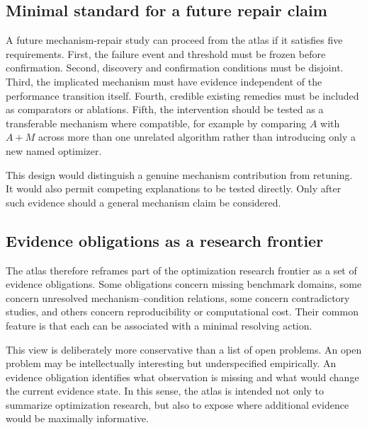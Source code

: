 \subsection{Minimal standard for a future repair claim}

A future mechanism-repair study can proceed from the atlas if it satisfies five requirements. First, the failure event and threshold must be frozen before confirmation. Second, discovery and confirmation conditions must be disjoint. Third, the implicated mechanism must have evidence independent of the performance transition itself. Fourth, credible existing remedies must be included as comparators or ablations. Fifth, the intervention should be tested as a transferable mechanism where compatible, for example by comparing \(A\) with \(A+M\) across more than one unrelated algorithm rather than introducing only a new named optimizer.

This design would distinguish a genuine mechanism contribution from retuning. It would also permit competing explanations to be tested directly. Only after such evidence should a general mechanism claim be considered.

\subsection{Evidence obligations as a research frontier}

The atlas therefore reframes part of the optimization research frontier as a set of evidence obligations. Some obligations concern missing benchmark domains, some concern unresolved mechanism--condition relations, some concern contradictory studies, and others concern reproducibility or computational cost. Their common feature is that each can be associated with a minimal resolving action.

This view is deliberately more conservative than a list of open problems. An open problem may be intellectually interesting but underspecified empirically. An evidence obligation identifies what observation is missing and what would change the current evidence state. In this sense, the atlas is intended not only to summarize optimization research, but also to expose where additional evidence would be maximally informative.
